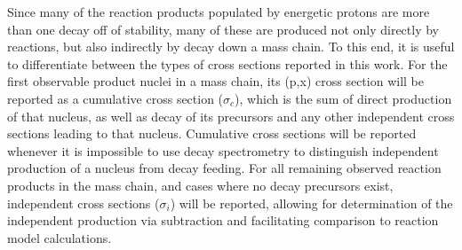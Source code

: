 \documentclass[3p]{elsarticle}
\begin{document}
Since many of the reaction products populated by energetic protons are more than one decay off of stability, many of these are produced not only  directly by reactions, but also indirectly by decay down a mass chain.
To this end, it is useful to differentiate between the types of cross sections reported in this work. 
For the first observable product nuclei in a mass chain, its (p,x) cross section will be reported as a cumulative cross section ($\sigma_c$), which is the sum of direct production of that nucleus, as well as decay of its  precursors and any other independent cross sections leading to that nucleus. 
Cumulative cross sections will be reported whenever it is impossible to use decay spectrometry to distinguish independent production of a nucleus from decay feeding.
For all remaining observed reaction products in the mass chain, and cases where no decay precursors exist, independent cross sections ($\sigma_i$) will be reported, allowing for determination of the independent production via subtraction  and facilitating comparison to reaction model calculations.  
\end{document}
